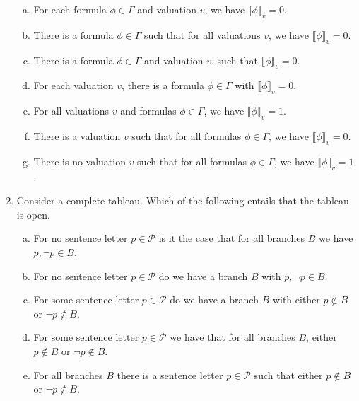 \begin{enumerate}[\thesection.1]
\begin{enumerate}[(a)]
			\item For each formula $\phi\in\Gamma$ and valuation $v$, we have $\llbracket\phi\rrbracket_v=0$.
			
			\item There is a formula $\phi\in\Gamma$ such that for all valuations $v$, we have $\llbracket\phi\rrbracket_v=0$.
			
			\item There is a formula $\phi\in\Gamma$ and valuation $v$, such that $\llbracket\phi\rrbracket_v=0$.
						
			\item For each valuation $v$, there is a formula $\phi\in\Gamma$ with $\llbracket\phi\rrbracket_v=0$.
			
			\item For all valuations $v$ and formulas $\phi\in\Gamma$, we have $\llbracket\phi\rrbracket_v=1$.
			
			\item There is a valuation $v$ such that for all formulas $\phi\in\Gamma$, we have $\llbracket\phi\rrbracket_v=0$.
			
			\item There is no valuation $v$ such that for all formulas $\phi\in\Gamma$, we have $\llbracket\phi\rrbracket_v=1$.
			
					
		\end{enumerate}
		
		\item Consider a complete tableau. Which of the following entails that the tableau is open.
		
		\begin{enumerate}[(a)]
		
			\item For no sentence letter $p\in\mathcal{P}$ is it the case that for all branches $B$ we have $p,\neg p\in B$.
			
			\item For no sentence letter $p\in\mathcal{P}$ do we have a branch $B$ with $p,\neg p\in B$.
			
			\item For some sentence letter $p\in\mathcal{P}$ do we have a branch $B$ with either $p\notin B$ or $\neg p\notin B$.
			
			\item For some sentence letter $p\in\mathcal{P}$ we have that for all branches $B$, either $p\notin B$ or $\neg p\notin B$.
			
			\item For all branches $B$ there is a sentence letter $p\in \mathcal{P}$ such that either $p\notin B$ or $\neg p\notin B$.
			

\end{enumerate}
\end{enumerate}

